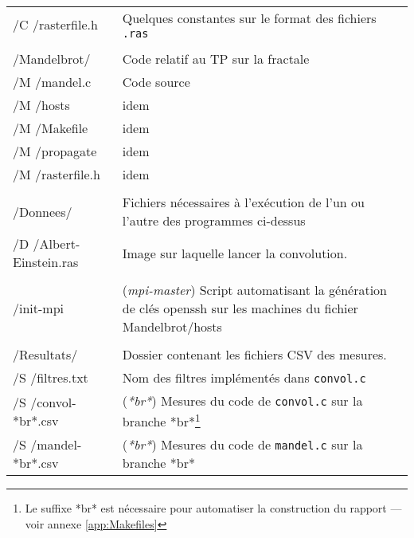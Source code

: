 \begin{onecolumn}
\begin{longtable}{>{\ttfamily}m{} p{}}
    /C /rasterfile.h           & Quelques constantes sur le format des
                                 fichiers \texttt{.ras}\\
                               & \\
    /Mandelbrot/               & Code relatif au TP sur la fractale\\
    /M /mandel.c               & Code source\\
    /M /hosts                  & idem\\
    /M /Makefile               & idem\\
    /M /propagate              & idem\\
    /M /rasterfile.h           & idem\\
                               & \\
    /Donnees/                  & Fichiers nécessaires à l'exécution de
                                 l'un ou l'autre des programmes
                                 ci-dessus\\
    /D /Albert-Einstein.ras    & Image sur laquelle lancer la
                                 convolution.\\
                               & \\
    /init-mpi                  & (\emph{mpi-master}) Script
                                 automatisant la génération de clés
                                 openssh sur les machines du
                                 fichier Mandelbrot/hosts\\
                               &\\
    /Resultats/                & Dossier contenant les fichiers CSV
                                 des mesures.\\
    /S /filtres.txt            & Nom des filtres implémentés dans
                                 \texttt{convol.c}\\
    /S /convol-*br*.csv        & (\emph{*br*}) Mesures du code de
                                 \texttt{convol.c} sur la branche
                                 *br*\footnote{Le suffixe *br* est
                                   nécessaire pour automatiser la
                                   construction du rapport — voir
                                   annexe \ref{app:Makefiles}}\\
    /S /mandel-*br*.csv        & (\emph{*br*}) Mesures du code de
                                 \texttt{mandel.c} sur la branche
                                 *br*\\

\end{longtable}
\end{onecolumn}
